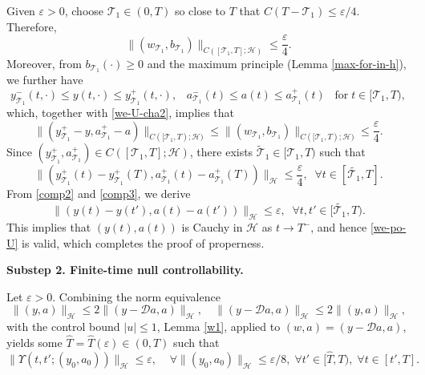 \documentclass[a4paper]{article}
\numberwithin{equation}{section}
\begin{document}
\begin{appendices}
Given $\varepsilon>0$, choose $\mathcal T_1 \in (0,T)$ so close to $T$ that $C(T-\mathcal T_1) \le \varepsilon/4$.
Therefore, 
\begin{equation}\label{we-U-cha2}
\|(w_{\mathcal{T}_1},b_{\mathcal{T}_1})\|_{C([\mathcal{T}_1,T];\mathcal{H})}\le  \frac{\varepsilon}{4}.
\end{equation}
Moreover, from $b_{\mathcal{T}_1}(\cdot)\ge 0$ and the maximum principle (Lemma \ref{max-for-in-h}), we further have
$$y_{\mathcal{T}_1}^-(t,\cdot)\le  y(t,\cdot)\le  y_{\mathcal{T}_1}^+(t,\cdot),\;\;\; a_{\mathcal{T}_1}^-(t)\le  a(t)\le  a_{\mathcal{T}_1}^+(t)\;\;\;\text{for}\;t\in[\mathcal{T}_1,T),$$
which, together with \eqref{we-U-cha2}, implies that
\begin{equation}\label{comp2}
\|( y_{\mathcal{T}_1}^+-y,a_{\mathcal{T}_1}^+-a)\|_{C([\mathcal{T}_1,T);\mathcal{H})}\le \|( w_{\mathcal{T}_1},b_{\mathcal{T}_1})\|_{C([\mathcal{T}_1,T);\mathcal{H})}\le\frac{\varepsilon}{4}.
\end{equation}
Since $( y_{\mathcal{T}_1}^+, a_{\mathcal{T}_1}^+)\in C([\mathcal{T}_1,T];\mathcal{H})$, there exists $\tilde{\mathcal{T}}_1\in [\mathcal{T}_1,T)$ such that
\begin{equation}\label{comp3}
\|( y_{\mathcal{T}_1}^+(t)-y_{\mathcal{T}_1}^+(T),a_{\mathcal{T}_1}^+(t)-a_{\mathcal{T}_1}^+(T))\|_{\mathcal{H}}\le\frac{\varepsilon}{4},\;\;\forall t\in[\tilde{\mathcal{T}_1},T].
\end{equation}
From \eqref{comp2} and \eqref{comp3}, we derive
\begin{equation}\label{comp4}
\|( y(t)-y(t'),a(t)-a(t'))\|_{\mathcal{H}}\le\varepsilon,\;\;\forall t,t'\in[\tilde{\mathcal{T}_1},T).
\end{equation}
This implies that $(y(t),a(t))$ is Cauchy in $\mathcal{H}$ as $t\to T^{-}$, and hence \eqref{we-po-U} is valid, which completes the proof of properness.

\noindent \textbf{Substep 2. Finite-time null controllability.}

Let $\varepsilon>0$. Combining the norm equivalence $$\|(y,a)\|_{\mathcal H}\le 2\|(y-\mathcal Da,a)\|_{\mathcal H}, \quad \|(y-\mathcal Da,a)\|_{\mathcal H}\le 2\|(y,a)\|_{\mathcal H}, $$ with the control bound $|u|\le 1$, Lemma \ref{w1}, applied to $(w,a)=(y-\mathcal Da,a)$, yields some $\hat T=\hat T(\varepsilon)\in(0,T)$ such that
\begin{equation}\label{1to269}\|\Upsilon(t,t';(y_0,a_0))\|_{\mathcal{H}}\le \varepsilon,\;\;\;\;\forall \|(y_0,a_0)\|_{\mathcal{H}}\le\varepsilon/8,\;\forall t'\in [\hat{T},T),\;\forall t\in[t',T].\end{equation}


\end{appendices}
\end{document}
